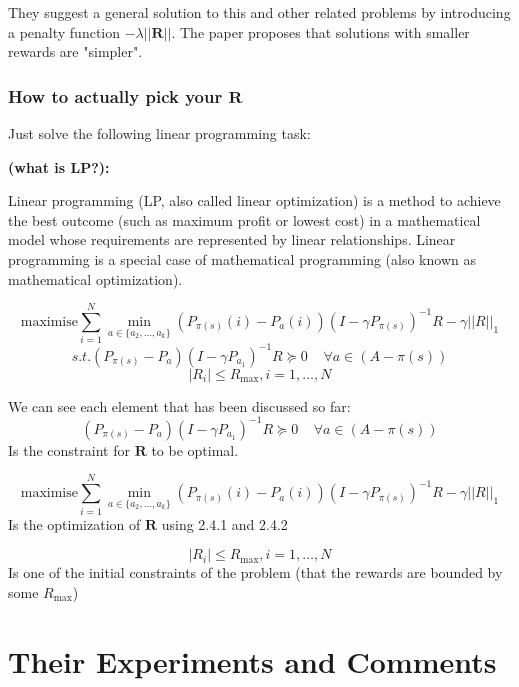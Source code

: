 \documentclass{article}
\begin{document}
    They suggest a general solution to this and other related problems by introducing a penalty function $-\lambda ||\mathbf{R}||$. The paper proposes that solutions with smaller rewards are "simpler".

    


    \subsubsection{How to actually pick your $\mathbf{R}$}

    Just solve the following linear programming task:

    \textbf{(what is LP?):}

    Linear programming (LP, also called linear optimization) is a method to achieve the best outcome (such as maximum profit or lowest cost) in a mathematical model whose requirements are represented by linear relationships. Linear programming is a special case of mathematical programming (also known as mathematical optimization). 

    $$\text{maximise} \sum_{i=1}^N \min_{a \in \{ a_2, \dots, a_k \}} (P_{\pi(s)}(i)- P_a(i)) (I - \gamma P_{\pi(s)})^{-1} R - \gamma ||R||_1$$
    $$s.t. (P_{\pi(s)} - P_a)(I - \gamma P_{a_1})^{-1} R \succeq 0 \;\;\;\; \forall a \in (A - \pi(s)) $$
    $$|R_i| \le R_{\max}, i = 1, \dots, N$$

    We can see each element that has been discussed so far:
    $$(P_{\pi(s)} - P_a)(I - \gamma P_{a_1})^{-1} R \succeq 0 \;\;\;\; \forall a \in (A - \pi(s)) $$
    Is the constraint for $\mathbf{R}$ to be optimal. 

    $$\text{maximise} \sum_{i=1}^N \min_{a \in \{ a_2, \dots, a_k \}} (P_{\pi(s)}(i)- P_a(i)) (I - \gamma P_{\pi(s)})^{-1} R - \gamma ||R||_1$$
    Is the optimization of $\mathbf{R}$ using 2.4.1 and 2.4.2
    
    $$|R_i| \le R_{\max}, i = 1, \dots, N$$
    Is one of the initial constraints of the problem (that the rewards are bounded by some $R_{\max}$)



    \section{Their Experiments and Comments}
\end{document}
